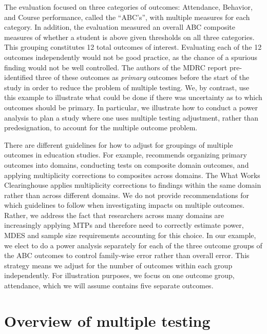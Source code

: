 \documentclass[
]{jss}
\begin{document}
The evaluation focused on three categories of outcomes: Attendance,
Behavior, and Course performance, called the ``ABC's'', with multiple
measures for each category. In addition, the evaluation measured an
overall ABC composite measures of whether a student is above given
thresholds on all three categories. This grouping constitutes 12 total
outcomes of interest. Evaluating each of the 12 outcomes independently
would not be good practice, as the chance of a spurious finding would
not be well controlled. The authors of the MDRC report pre-identified
three of these outcomes as \emph{primary} outcomes before the start of
the study in order to reduce the problem of multiple testing. We, by
contrast, use this example to illustrate what could be done if there was
uncertainty as to which outcomes should be primary. In particular, we
illustrate how to conduct a power analysis to plan a study where one
uses multiple testing adjustment, rather than predesignation, to account
for the multiple outcome problem.

There are different guidelines for how to adjust for groupings of
multiple outcomes in education studies. For example, \citet{RN23748}
recommends organizing primary outcomes into domains, conducting tests on
composite domain outcomes, and applying multiplicity corrections to
composites across domains. The What Works Clearinghouse applies
multiplicity corrections to findings within the same domain rather than
across different domains. We do not provide recommendations for which
guidelines to follow when investigating impacts on multiple outcomes.
Rather, we address the fact that researchers across many domains are
increasingly applying MTPs and therefore need to correctly estimate
power, MDES and sample size requirements accounting for this choice. In
our example, we elect to do a power analysis separately for each of the
three outcome groups of the ABC outcomes to control family-wise error
rather than overall error. This strategy means we adjust for the number
of outcomes within each group independently. For illustration purposes,
we focus on one outcome group, attendance, which we will assume contains
five separate outcomes.

\section{Overview of multiple testing}
\label{sec:mtp_overview}
\end{document}
